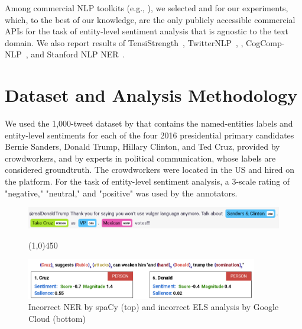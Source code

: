 \documentclass[11pt,a4paper]{article}
\begin{document}
Among commercial NLP toolkits (e.g., \citet{aylien,msftnlp,watsonnlu}), we selected \citet{gcnlp} and \citet{rosette} for our experiments, which, to the best of our knowledge, are the only publicly accessible commercial APIs for the task of entity-level sentiment analysis that is agnostic to the text domain. We also report results of TensiStrength~\citep{Thelwall17}, TwitterNLP~\citep{RitterClMaEt11}, \citet{spaCy}, CogComp-NLP~\citep{KhashabiSaZhre18}, and Stanford NLP NER~\citep{FiGrMa05}.



\section{Dataset and Analysis Methodology}
\label{sec:dataset}

We used the 1,000-tweet dataset by \citet{SamekiGeMaGuBe16} that contains the named-entities labels and entity-level sentiments for each of the four 2016 presidential primary candidates Bernie Sanders, Donald Trump, Hillary Clinton, and Ted Cruz, provided by crowdworkers, and by experts in political communication, whose labels are considered groundtruth.  The crowdworkers were located in the US and hired on the \citet{mTurk} platform. For the task of entity-level sentiment analysis, a 3-scale rating  of "negative," "neutral," and "positive" was used by the annotators.



\begin{figure}[ht]
\centering
\includegraphics[width=\textwidth]{spacy.png}
\begin{center}
\line(1,0){450}
\end{center}
\vspace*{-0.2cm}
\includegraphics[width=0.9\textwidth]{best.png}
\vspace*{-0.4cm}
\caption{Incorrect NER by spaCy (top) and incorrect ELS analysis by Google Cloud (bottom)}
\label{fig1}

\vspace{-.2cm}
\end{figure}
\end{document}
